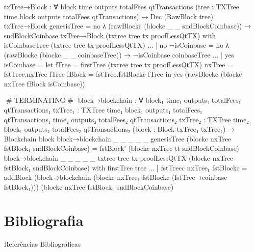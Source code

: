 \documentclass{beamer}
\begin{document}
\begin{code}
      txTree→Block : ∀
        {block time outputs totalFees qtTransactions}
        (tree : TXTree time block outputs totalFees qtTransactions)
        → Dec (RawBlock tree)
      txTree→Block genesisTree =
        no λ { (rawBlockc (blockc _ _ sndBlockCoinbase)) → sndBlockCoinbase }
      txTree→Block (txtree tree tx proofLessQtTX)
        with isCoinbaseTree (txtree tree tx proofLessQtTX)
      ... | no ¬isCoinbase =
              no λ{ (rawBlockc (blockc _ _ coinbaseTree)) → ¬isCoinbase coinbaseTree}
      ... | yes isCoinbase = let fTree = firstTree (txtree tree tx proofLessQtTX)
                                 nxTree = fstTree.nxTree fTree
                                 fBlock = fstTree.fstBlockc fTree
                             in yes (rawBlockc (blockc nxTree fBlock isCoinbase))

      {-# TERMINATING #-}
      block→blockchain : ∀
        {block₁ time₁ outputs₁ totalFees₁ qtTransactions₁}
        {txTree₁ : TXTree time₁ block₁ outputs₁ totalFees₁ qtTransactions₁}
        {time₂ outputs₂ totalFees₂ qtTransactions₂}
        {txTree₂ : TXTree time₂ block₁ outputs₂ totalFees₂ qtTransactions₂}
        (block : Block txTree₁ txTree₂)
        → Blockchain block
      block→blockchain {_} {_} {_} {_} {_} {genesisTree}
        (blockc nxTree fstBlock₁ sndBlockCoinbase) =
        fstBlock' (blockc nxTree tt sndBlockCoinbase)
      block→blockchain {_} {_} {_} {_} {_} {txtree tree tx proofLessQtTX}
        (blockc nxTree fstBlock₁ sndBlockCoinbase)
        with firstTree tree
      ... | fstTreec nxTree₁ fstBlockc = addBlock
        (block→blockchain (blockc nxTree₁ fstBlockc (fstTree→coinbase fstBlock₁)))
        (blockc nxTree fstBlock₁ sndBlockCoinbase)
\end{code}





\section{Bibliografia}

\begin{frame}{Referências Bibliográficas}
  
  
\end{frame}
\end{document}
